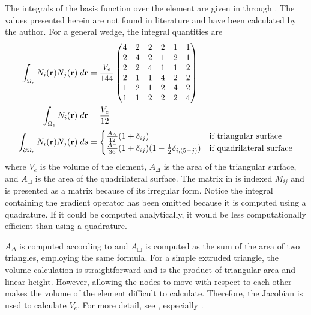       The integrals of the basis function over the element are given in
       through . The values
      presented herein are not found in literature and have been calculated by
      the author. For a general wedge, the integral quantities are
      \begin{align}
        \label{eq:bigmat}
        \int_{\Omega_e} N_i(\mathbf{r}) N_j(\mathbf{r}) \;d\mathbf{r} &= 
          \frac{V_e}{144}
          \begin{pmatrix}
            4 & 2 & 2 & 2 & 1 & 1 \\
            2 & 4 & 2 & 1 & 2 & 1 \\
            2 & 2 & 4 & 1 & 1 & 2 \\
            2 & 1 & 1 & 4 & 2 & 2 \\
            1 & 2 & 1 & 2 & 4 & 2 \\
            1 & 1 & 2 & 2 & 2 & 4 
          \end{pmatrix} \\
        \int_{\Omega_e} N_i(\mathbf{r}) \;d\mathbf{r} &= \frac{V_e}{12} \\
        \label{eq:wedge_surface_integral}
        \int_{\partial \Omega_e} N_i(\mathbf{r}) 
          N_j(\mathbf{r}) \;ds &= 
          \begin{cases}
            \frac{A_{\Delta}}{12}(1+\delta_{ij})&\text{if triangular surface} \\
            \frac{A_{\Box}}{36}(1+\delta_{ij})(1-\frac{1}{2} \delta_{i,(5-j)}) &
              \text{if quadrilateral surface}
          \end{cases}
      \end{align}
      where $V_e$ is the volume of the element, $A_{\Delta}$ is the area of the
      triangular surface, and $A_{\Box}$ is the area of the quadrilateral
      surface. 
      The matrix in  is indexed $M_{ij}$
      and is presented as a matrix because of its irregular form. Notice the 
      integral containing the gradient operator has been omitted because it is
      computed using a quadrature. If it could be computed analytically, it 
      would be less computationally efficient than using a quadrature.
      
      $A_{\Delta}$ is computed according to  and
      $A_{\Box}$ is computed as the sum of the area of two triangles, employing
      the same formula. For a simple extruded triangle, the volume calculation 
      is straightforward and is the product of triangular area and linear 
      height. However, allowing the nodes to move with respect to each other 
      makes the volume of the element difficult to calculate. Therefore, the 
      Jacobian is used to calculate $V_e$. For more detail, see 
      , especially .

